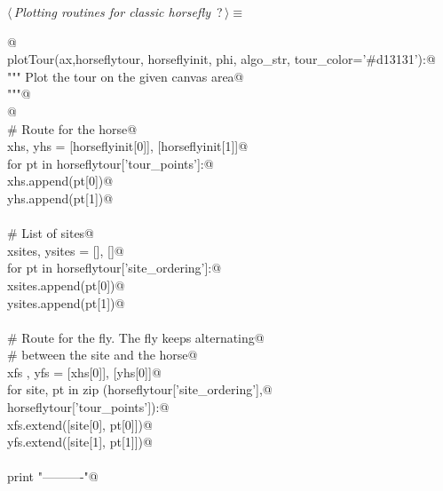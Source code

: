 \documentclass[11.5pt]{report}
\begin{document}
\begin{flushleft} \small\label{scrap43}\raggedright\small
{} $\langle\,${\itshape Plotting routines for classic horsefly}\nobreak\ {\footnotesize {?}}$\,\rangle\equiv$
\vspace{-1ex}
\begin{list}{}{} \item
\mbox{}\verb@ @\\
\mbox{}\verb@def plotTour(ax,horseflytour, horseflyinit, phi, algo_str, tour_color='#d13131'):@\\
\mbox{}\verb@    """ Plot the tour on the given canvas area@\\
\mbox{}\verb@    """@\\
\mbox{}\verb@   @\\
\mbox{}\verb@    # Route for the horse@\\
\mbox{}\verb@    xhs, yhs = [horseflyinit[0]], [horseflyinit[1]]@\\
\mbox{}\verb@    for pt in horseflytour['tour_points']:@\\
\mbox{}\verb@        xhs.append(pt[0])@\\
\mbox{}\verb@        yhs.append(pt[1])@\\
\mbox{}\verb@@\\
\mbox{}\verb@    # List of sites@\\
\mbox{}\verb@    xsites, ysites = [], []@\\
\mbox{}\verb@    for pt in horseflytour['site_ordering']:@\\
\mbox{}\verb@        xsites.append(pt[0])@\\
\mbox{}\verb@        ysites.append(pt[1])@\\
\mbox{}\verb@@\\
\mbox{}\verb@    # Route for the fly. The fly keeps alternating@\\
\mbox{}\verb@    # between the site and the horse@\\
\mbox{}\verb@    xfs , yfs = [xhs[0]], [yhs[0]]@\\
\mbox{}\verb@    for site, pt in zip (horseflytour['site_ordering'],@\\
\mbox{}\verb@                         horseflytour['tour_points']):@\\
\mbox{}\verb@        xfs.extend([site[0], pt[0]])@\\
\mbox{}\verb@        yfs.extend([site[1], pt[1]])@\\
\mbox{}\verb@@\\
\mbox{}\verb@    print "\n----------"@\\

\end{list}
\end{flushleft}
\end{document}
